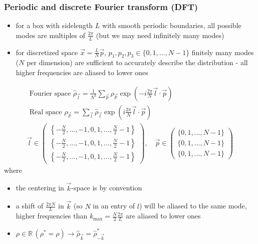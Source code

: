 \subsubsection*{Periodic and discrete Fourier transform (DFT)}
\begin{itemize}
    \item for a box with sidelength $L$ with smooth periodic boundaries, all possible
    modes are multiples of $\frac{2\pi}{L}$ (but we may need infinitely many modes)
    \item for discretized space $\vec{x} = \frac{L}{N}\vec{p}$, $p_1,p_2,p_3 \in \{ 0,1,\dots,N-1\}$
    finitely many modes ($N$ per dimension) are sufficient to accurately describe the distribution -
    all higher frequencies are aliased to lower ones
\end{itemize}
\begin{equation}
    \begin{gathered}
    \text { Fourier space } \hat{\rho}_{\vec{l}}=\frac{1}{N^3} \sum_{\vec{p}} \rho_{\vec{p}} \exp \left(-i \frac{2 \pi}{N} \vec{l} \cdot \vec{p}\right) \\
    \text { Real space } \rho_{\vec{p}}=\sum_{\vec{l}} \hat{\rho}_{\vec{l}} \exp \left(i \frac{2 \pi}{N} \vec{l} \cdot \vec{p}\right) \\
    \vec{l}\in\left(\begin{array}{l}
        \left\{-\frac{N}{2}, \ldots,-1,0,1, \ldots, \frac{N}{2}-1\right\} \\
        \left\{-\frac{N}{2}, \ldots,-1,0,1, \ldots, \frac{N}{2}-1\right\} \\
        \left\{-\frac{N}{2}, \ldots,-1,0,1, \ldots, \frac{N}{2}-1\right\}
    \end{array}\right), \quad \vec{p} \in \left(\begin{array}{l}
        \{0,1, \ldots, N-1\} \\
        \{0,1, \ldots, N-1\} \\
        \{0,1, \ldots, N-1\}
        \end{array}\right)
    \end{gathered}
\end{equation}
where
\begin{itemize}
    \item the centering in $\vec{k}$-space is by convention
    \item a shift of $\frac{2\pi N}{L}$ in $\vec{k}$ (so $N$ in an entry of $l$) will be aliased to the same mode, higher frequencies than $k_{\text{max}} = \frac{N}{2} \frac{2\pi}{L}$ are aliased to lower ones
    \item $ \rho \in \mathbb{R} \, (\rho^* = \rho) \rightarrow \hat{\rho}_{\vec{k}}=\hat{\rho}_{-\vec{k}}^{*}$
\end{itemize}

